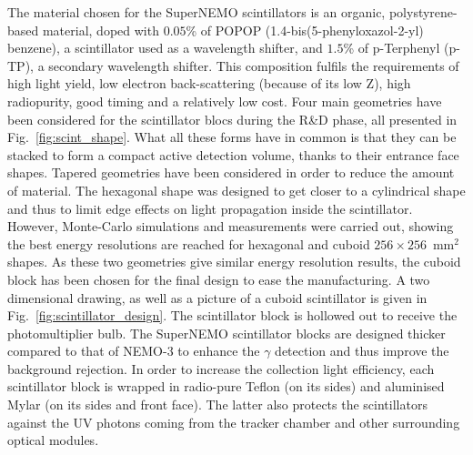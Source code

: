 The material chosen for the SuperNEMO scintillators is an organic, polystyrene-based material, doped with $0.05$\% of POPOP (1.4-bis(5-phenyloxazol-2-yl) benzene), a scintillator used as a wavelength shifter, and $1.5$\% of p-Terphenyl (p-TP), a secondary wavelength shifter.
This composition fulfils the requirements of high light yield, low electron back-scattering (because of its low Z), high radiopurity, good timing and a relatively low cost.
Four main geometries have been considered for the scintillator blocs during the R\&D phase, all presented in Fig.~\ref{fig:scint_shape}.
What all these forms have in common is that they can be stacked to form a compact active detection volume, thanks to their entrance face shapes.
Tapered geometries have been considered in order to reduce the amount of material.
The hexagonal shape was designed to get closer to a cylindrical shape and thus to limit edge effects on light propagation inside the scintillator.
However, Monte-Carlo simulations and measurements were carried out, showing the best energy resolutions are reached for hexagonal and cuboid $256\times256$~mm$^{2}$ shapes.
As these two geometries give similar energy resolution results, the cuboid block has been chosen for the final design to ease the manufacturing.
A two dimensional drawing, as well as a picture of a cuboid scintillator is given in Fig.~\ref{fig:scintillator_design}.
The scintillator block is hollowed out to receive the photomultiplier bulb.
The SuperNEMO scintillator blocks are designed thicker compared to that of NEMO-$3$ to enhance the $\gamma$ detection and thus improve the background rejection.
In order to increase the collection light efficiency, each scintillator block is wrapped in radio-pure Teflon (on its sides) and aluminised Mylar (on its sides and front face).
The latter also protects the scintillators against the UV photons coming from the tracker chamber and other surrounding optical modules.
